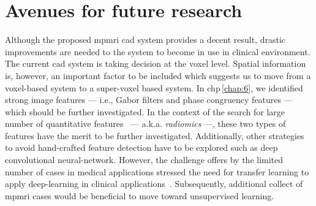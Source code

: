 \section{Avenues for future research}

Although the proposed \ac{mpmri} \ac{cad} system provides a decent result, drastic improvements are needed to the system to become in use in clinical environment.
The current \ac{cad} system is taking decision at the voxel level.
Spatial information is, however, an important factor to be included which suggests us to move from a voxel-based system to a super-voxel based system.
In \acs{chp}\,\ref{chap:6}, we identified strong image features --- i.e., Gabor filters and phase congruency features --- which should be further investigated.
In the context of the search for large number of quantitative features~\cite{lambin2012radiomics} --- a.k.a. \emph{radiomics} ---, these two types of features have the merit to be further investigated.
Additionally, other strategies to avoid hand-crafted feature detection have to be explored such as deep convolutional neural-network.
However, the challenge offers by the limited number of cases in medical applications stressed the need for transfer learning to apply deep-learning in clinical applications~\cite{shin2016deep}.
Subsequently, additional collect of \ac{mpmri} cases would be beneficial to move toward unsupervised learning.